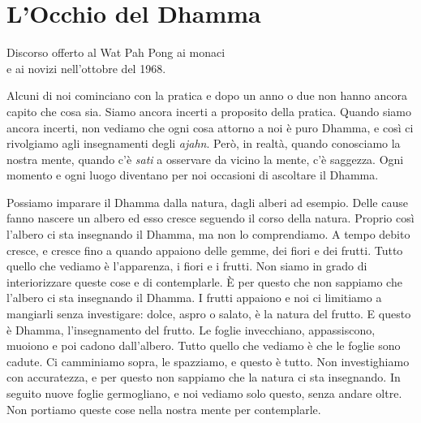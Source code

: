 \chapter{L'Occhio del Dhamma}

\begin{openingQuote}
  \centering

  Discorso offerto al Wat Pah Pong ai monaci\\
  e ai novizi nell'ottobre del 1968.
\end{openingQuote}

Alcuni di noi cominciano con la pratica e dopo un anno o due non hanno
ancora capito che cosa sia. Siamo ancora incerti a proposito della
pratica. Quando siamo ancora incerti, non vediamo che ogni cosa attorno
a noi è puro Dhamma, e così ci rivolgiamo agli insegnamenti degli
\emph{ajahn}. Però, in realtà, quando conosciamo la nostra mente, quando
c'è \emph{sati} a osservare da vicino la mente, c'è saggezza. Ogni
momento e ogni luogo diventano per noi occasioni di ascoltare il Dhamma.

Possiamo imparare il Dhamma dalla natura, dagli alberi ad esempio. Delle
cause fanno nascere un albero ed esso cresce seguendo il corso della
natura. Proprio così l'albero ci sta insegnando il Dhamma, ma non lo
comprendiamo. A tempo debito cresce, e cresce fino a quando appaiono
delle gemme, dei fiori e dei frutti. Tutto quello che vediamo è
l'apparenza, i fiori e i frutti. Non siamo in grado di interiorizzare
queste cose e di contemplarle. È per questo che non sappiamo che
l'albero ci sta insegnando il Dhamma. I frutti appaiono e noi ci
limitiamo a mangiarli senza investigare: dolce, aspro o salato, è la
natura del frutto. E questo è Dhamma, l'insegnamento del frutto. Le
foglie invecchiano, appassiscono, muoiono e poi cadono dall'albero.
Tutto quello che vediamo è che le foglie sono cadute. Ci camminiamo
sopra, le spazziamo, e questo è tutto. Non investighiamo con
accuratezza, e per questo non sappiamo che la natura ci sta insegnando.
In seguito nuove foglie germogliano, e noi vediamo solo questo, senza
andare oltre. Non portiamo queste cose nella nostra mente per
contemplarle.

